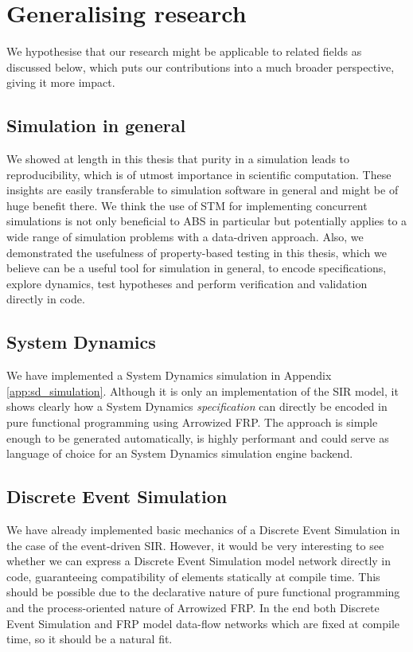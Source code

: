 \section{Generalising research}
We hypothesise that our research might be applicable to related fields as discussed below, which puts our contributions into a much broader perspective, giving it more impact.

\subsection{Simulation in general}
We showed at length in this thesis that purity in a simulation leads to reproducibility, which is of utmost importance in scientific computation. These insights are easily transferable to simulation software in general and might be of huge benefit there. %
We think the use of STM for implementing concurrent simulations is not only beneficial to ABS in particular but potentially applies to a wide range of simulation problems with a data-driven approach. Also, we demonstrated the usefulness of property-based testing in this thesis, which we believe can be a useful tool for simulation in general, to encode specifications, explore dynamics, test hypotheses and perform verification and validation directly in code.

\subsection{System Dynamics}
We have implemented a System Dynamics simulation in Appendix \ref{app:sd_simulation}. Although it is only an implementation of the SIR model, it shows clearly how a System Dynamics \textit{specification} can directly be encoded in pure functional programming using Arrowized FRP. The approach is simple enough to be generated automatically, is highly performant and could serve as language of choice for an System Dynamics simulation engine backend.

\subsection{Discrete Event Simulation}
We have already implemented basic mechanics of a Discrete Event Simulation in the case of the event-driven SIR. However, it would be very interesting to see whether we can express a Discrete Event Simulation model network directly in code, guaranteeing compatibility of elements statically at compile time. This should be possible due to the declarative nature of pure functional programming and the process-oriented nature of Arrowized FRP. In the end both Discrete Event Simulation and FRP model data-flow networks which are fixed at compile time, so it should be a natural fit.

